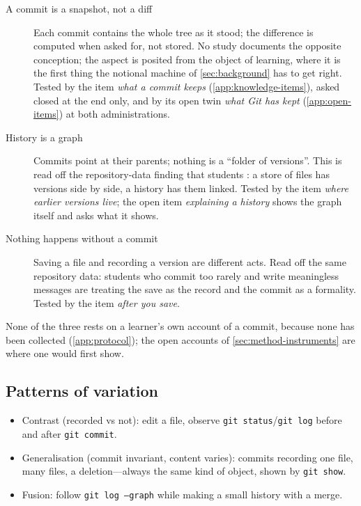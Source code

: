 \begin{description}
  \item[A commit is a snapshot, not a diff]
    Each commit contains the whole tree as it stood; the difference is
    computed when asked for, not stored.
    No study documents the opposite conception; the aspect is posited
    from the object of learning, where it is the first thing the
    notional machine of \cref{sec:background} has to get right.
    Tested by the item \emph{what a commit keeps}
    (\cref{app:knowledge-items}), asked closed at the end only, and by
    its open twin \emph{what Git has kept} (\cref{app:open-items}) at
    both administrations.
  \item[History is a graph]
    Commits point at their parents; nothing is a \enquote{folder of
    versions}.
    This is read off the repository-data finding that students
    : a store of files has versions side by side, a
    history has them linked.
    Tested by the item \emph{where earlier versions live}; the open item
    \emph{explaining a history} shows the graph itself and asks what it
    shows.
  \item[Nothing happens without a commit]
    Saving a file and recording a version are different acts.
    Read off the same repository data: students who commit too rarely
    and write meaningless messages \autocite{Cochez2013DVCSUsage} are
    treating the save as the record and the commit as a formality.
    Tested by the item \emph{after you save}.
\end{description}

None of the three rests on a learner's own account of a commit, because
none has been collected (\cref{app:protocol}); the open accounts of
\cref{sec:method-instruments} are where one would first show.

\subsection{Patterns of variation}

\begin{itemize}
  \item Contrast (recorded vs not): edit a file, observe
    \texttt{git status}/\texttt{git log} before and after
    \texttt{git commit}.
  \item Generalisation (commit invariant, content varies): commits
    recording one file, many files, a deletion---always the same kind of
    object, shown by \texttt{git show}.
  \item Fusion: follow \texttt{git log --graph} while making a small
    history with a merge.
\end{itemize}
